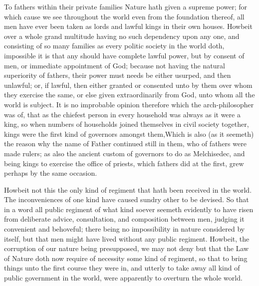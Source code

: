 To fathers within their private families Nature hath given a supreme power; for which cause we see throughout the world even from the foundation thereof, all men have ever been taken as lords and lawful kings in their own houses. Howbeit over a whole grand multitude having no such dependency upon any one, and consisting of so many families as every politic society in the world doth, impossible it is that any should have complete lawful power, but by consent of men, or immediate appointment of God; because not having the natural superiority of fathers, their power must needs be either usurped, and then unlawful; or, if lawful, then either granted or consented unto by them over whom they exercise the same, or else given extraordinarily from God, unto whom all the world is subject. It is no improbable opinion therefore which the arch-philosopher was of, that as the chiefest person  in every household was always as it were a king, so when numbers of households joined themselves in civil society together, kings were the first kind of governors amongst them,Which is also (as it seemeth) the reason why the name of Father continued still in them, who of fathers were made rulers; as also the ancient custom of governors to do as Melchisedec, and being kings to exercise the office of priests, which fathers did at the first, grew perhaps by the same occasion.

Howbeit not this the only kind of regiment that hath been received in the world. The inconveniences of one kind have caused sundry other to be devised. So that in a word all public regiment of what kind soever seemeth evidently to have risen from deliberate advice, consultation, and composition between men, judging it convenient and behoveful; there being no impossibility in nature considered by itself, but that men might have lived without any public regiment. Howbeit, the corruption of our nature being presupposed, we may not deny but that the Law of Nature doth now require of necessity some kind of regiment, so that to bring things unto the first course they were in, and utterly to take away all kind of public government in the world, were apparently to overturn the whole world.

